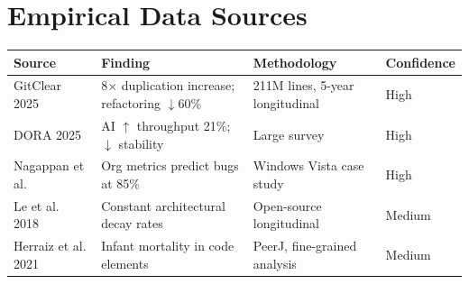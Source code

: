 \documentclass[11pt, a4paper, logo, copyright]{googledeepmind}
\begin{document}
\section{Empirical Data Sources}
\label{app:data}

\begin{center}
\begin{tabular}{lp{4cm}p{4cm}l}
\toprule
Source & Finding & Methodology & Confidence \\
\midrule
GitClear 2025 & 8$\times$ duplication increase; refactoring $\downarrow$60\% & 211M lines, 5-year longitudinal & High \\
DORA 2025 & AI $\uparrow$ throughput 21\%; $\downarrow$ stability & Large survey & High \\
Nagappan et al. & Org metrics predict bugs at 85\% & Windows Vista case study & High \\
Le et al. 2018 & Constant architectural decay rates & Open-source longitudinal & Medium \\
Herraiz et al. 2021 & Infant mortality in code elements & PeerJ, fine-grained analysis & Medium \\
\bottomrule
\end{tabular}
\end{center}
\end{document}
